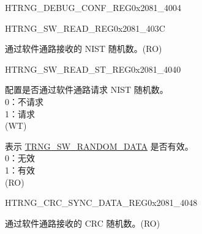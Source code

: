 \begin{register}{H}{TRNG\_DEBUG\_CONF\_REG}{0x2081\_4004}
\begin{regdesc}
\begin{reglist}
\end{reglist}\end{regdesc}
\end{register}


\begin{register}{H}{TRNG\_SW\_READ\_REG}{0x2081\_403C}\label{regdesc:TRNGSWREADREG}
%

\regnewline%
\begin{regdesc}\begin{reglist}

\label{fielddesc:TRNGSWRANDOMDATA}\item [TRNG\_SW\_RANDOM\_DATA] 通过软件通路接收的 NIST 随机数。(RO)

\end{reglist}\end{regdesc}
\end{register}


\begin{register}{H}{TRNG\_SW\_READ\_ST\_REG}{0x2081\_4040}\label{regdesc:TRNGSWREADSTREG}
%
%
%

\regnewline%
\begin{regdesc}\begin{reglist}

\label{fielddesc:TRNGSWRANDOMREQ}\item [TRNG\_SW\_RANDOM\_REQ] 配置是否通过软件通路请求 NIST 随机数。\\
0：不请求\\
1：请求\\
(WT)

\label{fielddesc:TRNGSWDATAVALID}\item [TRNG\_SW\_DATA\_VALID] 表示 \hyperref[fielddesc:TRNGSWRANDOMDATA]{TRNG\_SW\_RANDOM\_DATA} 是否有效。\\
0：无效\\
1：有效\\
(RO)

\end{reglist}\end{regdesc}
\end{register}


\begin{register}{H}{TRNG\_CRC\_SYNC\_DATA\_REG}{0x2081\_4048}\label{regdesc:TRNGCRCSYNCDATAREG}
%

\regnewline%
\begin{regdesc}\begin{reglist}

\label{fielddesc:TRNGSWCRCRANDOMDATASYNC}\item [TRNG\_SW\_CRC\_RANDOM\_DATA\_SYNC] 通过软件通路接收的 CRC 随机数。(RO)



\end{reglist}\end{regdesc}
\end{register}
